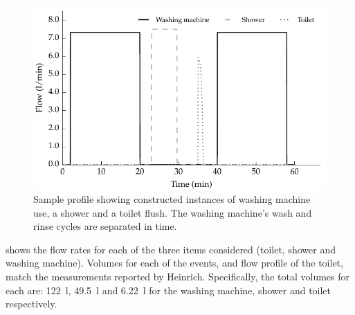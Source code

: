     \begin{figure}
      \centering
      \includegraphics[width=\linewidth]{content/pt1/02-WirelessWaterMeter/graphics/graph_profile}
      \caption{
          Sample profile showing constructed instances of washing machine use, a shower and a toilet flush.
          The washing machine's wash and rinse cycles are separated in time.}
      \label{fig:profileSample}
    \end{figure}
     shows the flow rates for each of the three items considered (toilet, shower and washing machine).
    Volumes for each of the events, and flow profile of the toilet, match the measurements reported by Heinrich.
    Specifically, the total volumes for each are: \SI{122}{\litre}, \SI{49.5}{\litre} and \SI{6.22}{\litre} for the washing machine, shower and toilet respectively.

